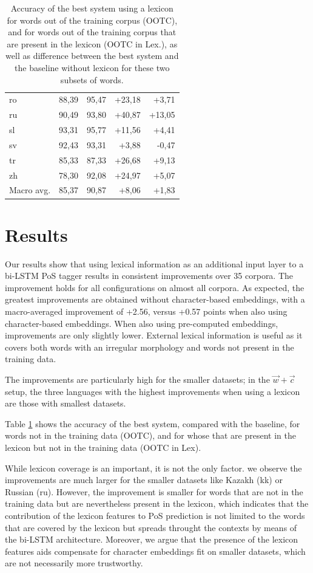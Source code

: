 \documentclass[11pt,a4paper]{article}
\begin{document}
\begin{table}[th]
\begin{tabular}{lrrrr}
ro & 88,39 & 95,47 & +23,18 & +3,71\\
ru & 90,49 & 93,80 & +40,87 & +13,05\\
sl & 93,31 & 95,77 & +11,56 & +4,41\\
sv & 92,43 & 93,31 & +3,88 & -0,47\\
tr & 85,33 & 87,33 & +26,68 & +9,13\\
zh & 78,30 & 92,08 & +24,97 & +5,07\\
\midrule
Macro avg. & 85,37 & 90,87 & +8,06 & +1,83\\
\bottomrule
\end{tabular}
\caption{Accuracy of the best system using a lexicon for words out of the training corpus (OOTC), and for words out of the training corpus that are present in the lexicon (OOTC in Lex.), as well as difference between the best system and the baseline without lexicon for these two subsets of words. \label{tbl:acc_oov}}
\end{table}


\section{Results}

Our results show that using lexical information as an additional input layer to a bi-LSTM PoS tagger results in
consistent improvements over 35 corpora. The improvement holds for all configurations on almost all corpora. As
expected, the greatest improvements are obtained without character-based embeddings, with a macro-averaged improvement
of +2.56, versus +0.57 points when also using character-based embeddings. When also using pre-computed embeddings,
improvements are only slightly lower. External lexical information is useful as it covers both words with an irregular
morphology and words not present in the training data.

The improvements are particularly high for the smaller datasets; in the $\vec{w}+\vec{c}$ setup, the three
languages with the highest improvements when using a lexicon are those with smallest datasets.

Table \ref{tbl:acc_oov} shows the accuracy of the best system, compared with the baseline, for words not in the training data (OOTC), and for whose that are present in the lexicon but not in the training data (OOTC in Lex). 

While lexicon coverage is an important, it is not the only factor. we observe the improvements are much larger for the smaller datasets like Kazakh (kk) or Russian (ru). However, the improvement is smaller for words that are not in the training data but are nevertheless present in the lexicon, which indicates that the contribution of the lexicon features to PoS prediction is not limited to the words that are covered by the lexicon but spreads throught the contexts by means of the bi-LSTM architecture. Moreover, we argue that the presence of the lexicon features aids compensate for character embeddings fit on smaller datasets, which are not necessarily more trustworthy. 
\end{document}
